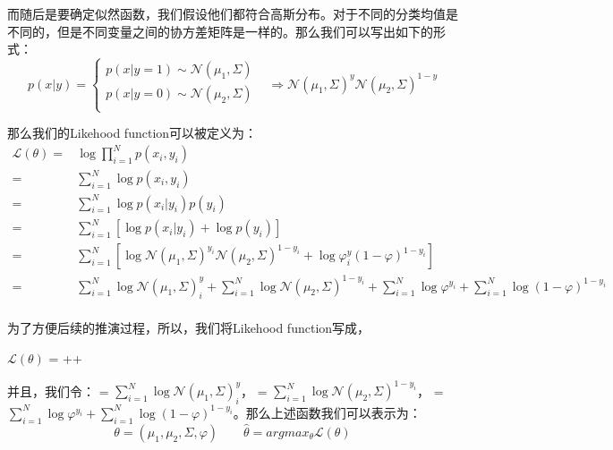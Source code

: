 \documentclass[a4paper]{article}
\begin{document}
而随后是要确定似然函数，我们假设他们都符合高斯分布。对于不同的分类均值是不同的，但是不同变量之间的协方差矩阵是一样的。那么我们可以写出如下的形式：
\begin{equation}
    p(x|y)=
    \left\{
        \begin{array}{ll}
            p(x|y=1)\sim \mathcal{N}(\mu_1, \Sigma) & \\
            p(x|y=0)\sim \mathcal{N}(\mu_2, \Sigma) & \\
        \end{array}
    \right.
    \Rightarrow
    \mathcal{N}(\mu_1, \Sigma)^y\mathcal{N}(\mu_2, \Sigma)^{1-y}
\end{equation}

那么我们的Likehood function可以被定义为：
\begin{equation}
    \begin{split}
        \mathcal{L}(\theta) = & \log\prod_{i=1}^Np(x_i,y_i) \\
         = & \sum_{i=1}^N\log p(x_i,y_i) \\
         = & \sum_{i=1}^N\log p(x_i|y_i)p(y_i) \\
         = & \sum_{i=1}^N\left[ \log p(x_i|y_i)+ \log p(y_i) \right]\\
         = & \sum_{i=1}^N\left[ \log \mathcal{N}(\mu_1, \Sigma)^{y_i}\mathcal{N}(\mu_2, \Sigma)^{1-y_i}+ \log \varphi^y_i(1-\varphi)^{1-y_i} \right]\\
         = & \sum_{i=1}^N \log \mathcal{N}(\mu_1, \Sigma)^y_i + \sum_{i=1}^N \log \mathcal{N}(\mu_2, \Sigma)^{1-y_i}+ \sum_{i=1}^N \log \varphi^{y_i} + \sum_{i=1}^N \log (1-\varphi)^{1-y_i} \\
    \end{split}
\end{equation}

为了方便后续的推演过程，所以，我们将Likehood function写成，
\begin{center}
    $\mathcal{L}(\theta)$ = ++
\end{center}

并且，我们令：
 = $\sum_{i=1}^N \log \mathcal{N}(\mu_1, \Sigma)^y_i$， = $\sum_{i=1}^N \log \mathcal{N}(\mu_2, \Sigma)^{1-y_i}$， = $\sum_{i=1}^N \log \varphi^{y_i} + \sum_{i=1}^N \log (1-\varphi)^{1-y_i}$。那么上述函数我们可以表示为：
\begin{equation}
    \theta = (\mu_1,\mu_2,\Sigma,\varphi) \qquad \hat{\theta} = argmax_{\theta} \mathcal{L}(\theta)
\end{equation}
\end{document}
